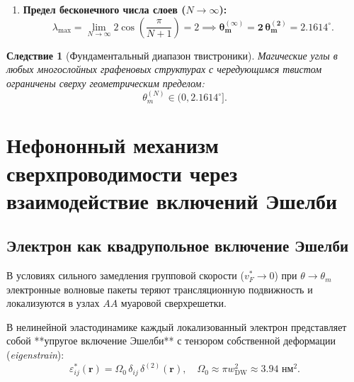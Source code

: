 \documentclass[12pt,a4paper]{article}
\newtheorem{corollary}{Следствие}
\begin{document}
\begin{enumerate}
	\item \textbf{Предел бесконечного числа слоев ($N \to \infty$):}
	\begin{equation}
		\lambda_{\text{max}} = \lim_{N \to \infty} 2 \cos\left(\frac{\pi}{N+1}\right) = 2 \implies \mathbf{\theta_m^{(\infty)} = 2 \, \theta_m^{(2)} = \mathbf{2.1614^\circ}}.
	\end{equation}
\end{enumerate}

\begin{corollary}[Фундаментальный диапазон твистроники]
	Магические углы в любых многослойных графеновых структурах с чередующимся твистом ограничены сверху геометрическим пределом:
	\begin{equation}
		\theta_m^{(N)} \in (0, 2.1614^\circ].
	\end{equation}
\end{corollary}

\section{Нефононный механизм сверхпроводимости через взаимодействие включений Эшелби}

\subsection{Электрон как квадрупольное включение Эшелби}
В условиях сильного замедления групповой скорости ($v_F^* \to 0$) при $\theta \to \theta_m$ электронные волновые пакеты теряют трансляционную подвижность и локализуются в узлах $AA$ муаровой сверхрешетки. 

В нелинейной эластодинамике каждый локализованный электрон представляет собой **упругое включение Эшелби** с тензором собственной деформации (\textit{eigenstrain}):
\begin{equation}
	\varepsilon_{ij}^*(\mathbf{r}) = \Omega_0 \, \delta_{ij} \, \delta^{(2)}(\mathbf{r}), \quad \Omega_0 \approx \pi w_{\text{DW}}^2 \approx 3.94\text{ нм}^2.
\end{equation}

\end{document}
